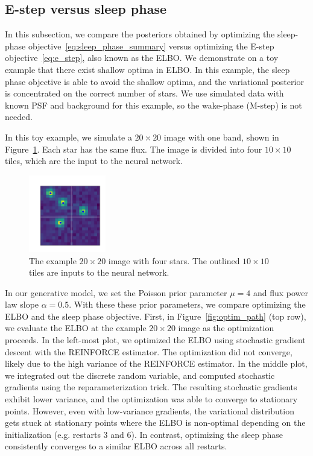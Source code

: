 \subsection{E-step versus sleep phase}
\label{sec:estep_sleep_compare}

In this subsection, we compare the posteriors obtained by optimizing the sleep-phase objective~\eqref{eq:sleep_phase_summary} 
versus optimizing the E-step objective~\eqref{eq:e_step}, also known as the ELBO. 
We demonstrate on a toy example that there exist shallow optima in ELBO. In this example, the sleep phase objective is able to avoid the shallow optima, and the variational posterior is concentrated on the correct number of stars. We use simulated data with known PSF and background for this example, so the wake-phase (M-step) is not needed. 

In this toy example, we simulate a $20\times20$ image with one band, shown in Figure~\ref{fig:toy_example}. Each star has the same flux. The image is divided into four $10\times 10$ tiles, which are the input to the neural network. 
\begin{figure}[!h]
    \centering
    \vspace{-1em}
    \includegraphics[width = 0.3\textwidth]{figures/vi_sleep_ex_figure.png}
    \vspace{-1.7em}
    \caption{The example $20\times 20$ image with four stars. The outlined $10\times 10$ tiles are inputs to the neural network. }
    \label{fig:toy_example}
\end{figure}

In our generative model, we set the Poisson prior parameter $\mu = 4$ and flux power law slope $\alpha = 0.5$. With these these prior parameters, we compare optimizing the ELBO and the sleep phase objective. First, in Figure~\ref{fig:optim_path} (top row), we evaluate the ELBO at the example $20\times 20$ image as the optimization proceeds. In the left-most plot, we optimized the ELBO using stochastic gradient descent with the REINFORCE estimator. The optimization did not converge, likely due to the high variance of the REINFORCE estimator. In the middle plot, we integrated out the discrete random variable, and computed stochastic gradients using the reparameterization trick. The resulting stochastic gradients exhibit lower variance, and the optimization was able to converge to stationary points. However, even with low-variance gradients, the variational distribution gets stuck at stationary points where the ELBO is non-optimal depending on the initialization (e.g. restarts 3 and 6). In contrast, optimizing the sleep phase consistently converges to a similar ELBO across all restarts. 

